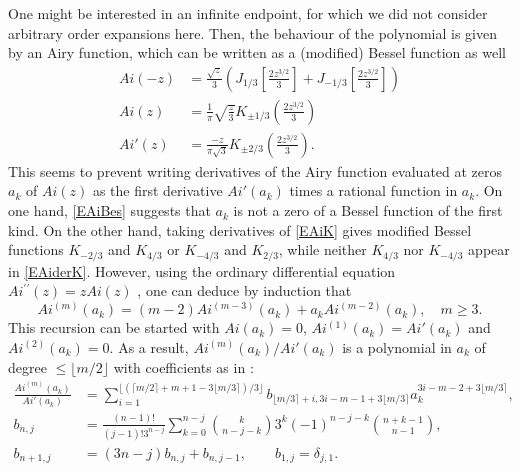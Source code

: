 \documentclass[11pt]{article}
\numberwithin{equation}{section}
\begin{document}
One might be interested in an infinite endpoint, for which we did not consider arbitrary order expansions here. Then, the behaviour of the polynomial is given by an Airy function, which can be written as a (modified) Bessel function as well %
\cite[\S 9.6]{DLMF}
\begin{align}
	Ai(-z) & = \frac{\sqrt{z}}{3} \left(J_{1/3} \left[\frac{2z^{3/2}}{3} \right] + J_{-1/3} \left[\frac{2z^{3/2}}{3} \right] \right) \label{EAiBes}\\
	Ai(z) & = \frac{1}{\pi} \sqrt{\frac{z}{3}} K_{\pm 1/3}\left(\frac{2 z^{3/2}}{3}\right) \label{EAiK}\\
	Ai'(z) & = \frac{-z}{\pi\sqrt{3} } K_{\pm 2/3}\left(\frac{2 z^{3/2}}{3}\right). \label{EAiderK}
\end{align}
This seems to prevent writing derivatives of the Airy function evaluated at zeros $a_k$ of $Ai(z)$ as the first derivative $Ai'(a_k)$ times a rational function in $a_k$. On one hand, \cref{EAiBes} suggests that $a_k$ is not a zero of a Bessel function of the first kind. On the other hand, taking derivatives of \cref{EAiK} gives modified Bessel functions $K_{-2/3}$ and $K_{4/3}$ or $K_{-4/3}$ and $K_{2/3}$, while neither $K_{4/3}$ nor $K_{-4/3}$ appear in \cref{EAiderK}. However, using the ordinary differential equation $Ai^{\prime\prime}(z) = zAi(z)$%
, one can deduce by induction that
\begin{equation}
	Ai^{(m)}(a_k) = (m-2)Ai^{(m-3)}(a_k) + a_k Ai^{(m-2)}(a_k), \quad m \geq 3.
\end{equation}
This recursion can be started with $Ai(a_k) = 0$, $Ai^{(1)}(a_k) = Ai'(a_k)$ and $Ai^{(2)}(a_k) = 0$. As a result, $Ai^{(m)}(a_k)/Ai'(a_k)$ is a polynomial in $a_k$ of degree $\leq \lfloor m/2 \rfloor$ with coefficients as in \cite[A004747]{oeis}: 
\begin{align}
	\frac{Ai^{(m)}(a_k)}{Ai'(a_k)} & = \sum_{i=1}^{\lfloor \left(\lceil m/2 \rceil +m +1 - 3\lfloor m/3 \rceil \right) /3 \rfloor } b_{\lfloor m/3 \rceil +i, 3i-m -1 + 3\lfloor m/3 \rceil} a_k^{3i-m -2 + 3\lfloor m/3 \rceil}, \\ 
	b_{n,j} & = \frac{(n-1)!}{(j-1)! 3^{n-j} } \sum_{k=0}^{n-j} {k \choose n-j-k} 3^k (-1)^{n-j-k} {n+k-1 \choose n-1}, \\
	b_{n+1,j} & = (3n-j) b_{n,j} + b_{n,j-1}, \qquad b_{1,j} = \delta_{j,1}. \\ 
\end{align}
\end{document}
